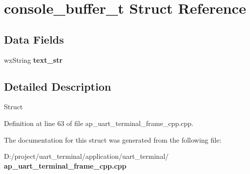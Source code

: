 \section{console\+\_\+buffer\+\_\+t Struct Reference}
\label{structconsole__buffer__t}
\subsection*{Data Fields}
\begin{DoxyCompactItemize}
\item 
\mbox{\label{structconsole__buffer__t_ae027b01a16a8b9ded760f0ead4d7a951}} 
wx\+String {\bfseries text\+\_\+str}
\end{DoxyCompactItemize}


\subsection{Detailed Description}
Struct 

Definition at line 63 of file ap\+\_\+uart\+\_\+terminal\+\_\+frame\+\_\+cpp.\+cpp.



The documentation for this struct was generated from the following file\+:\begin{DoxyCompactItemize}
\item 
D\+:/project/uart\+\_\+terminal/application/uart\+\_\+terminal/\textbf{ ap\+\_\+uart\+\_\+terminal\+\_\+frame\+\_\+cpp.\+cpp}\end{DoxyCompactItemize}
